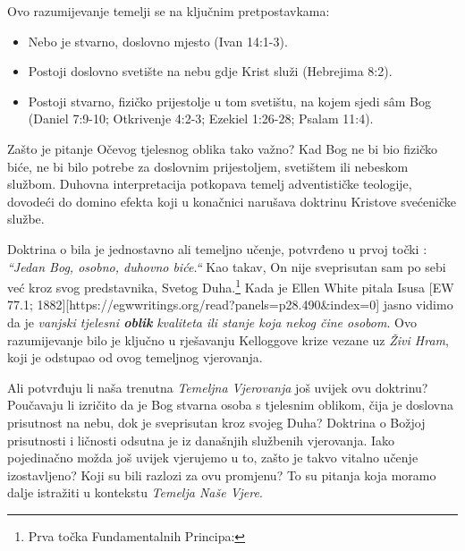 Ovo razumijevanje temelji se na ključnim pretpostavkama:
\begin{itemize}
    \item Nebo je stvarno, doslovno mjesto (Ivan 14:1-3).
    \item Postoji doslovno svetište na nebu gdje Krist služi (Hebrejima 8:2).
    \item Postoji stvarno, fizičko prijestolje u tom svetištu, na kojem sjedi sâm Bog (Daniel 7:9-10; Otkrivenje 4:2-3; Ezekiel 1:26-28; Psalam 11:4).
\end{itemize}

Zašto je pitanje Očevog tjelesnog oblika tako važno? Kad Bog ne bi bio fizičko biće, ne bi bilo potrebe za doslovnim prijestoljem, svetištem ili nebeskom službom. Duhovna interpretacija potkopava temelj adventističke teologije, dovodeći do domino efekta koji u konačnici narušava doktrinu Kristove svećeničke službe.

Doktrina o  bila je jednostavno ali temeljno učenje, potvrđeno u prvoj točki : \textit{“Jedan Bog, osobno, duhovno biće.“} Kao takav, On nije sveprisutan sam po sebi već kroz svog predstavnika, Svetog Duha.\footnote{Prva točka Fundamentalnih Principa: } Kada je Ellen White pitala Isusa [EW 77.1; 1882][https://egwwritings.org/read?panels=p28.490&index=0] jasno vidimo da je \textit{vanjski tjelesni \textbf{oblik}} \textit{kvaliteta ili stanje koja nekog čine osobom}. Ovo razumijevanje bilo je ključno u rješavanju Kelloggove krize vezane uz \textit{Živi Hram}, koji je odstupao od ovog temeljnog vjerovanja.

Ali potvrđuju li naša trenutna \textit{Temeljna Vjerovanja} još uvijek ovu doktrinu? Poučavaju li izričito da je Bog stvarna osoba s tjelesnim oblikom, čija je doslovna prisutnost na nebu, dok je sveprisutan kroz svojeg Duha? Doktrina o Božjoj prisutnosti i ličnosti odsutna je iz današnjih službenih vjerovanja. Iako pojedinačno možda još uvijek vjerujemo u to, zašto je takvo vitalno učenje izostavljeno? Koji su bili razlozi za ovu promjenu? To su pitanja koja moramo dalje istražiti u kontekstu \textit{Temelja Naše Vjere}.
